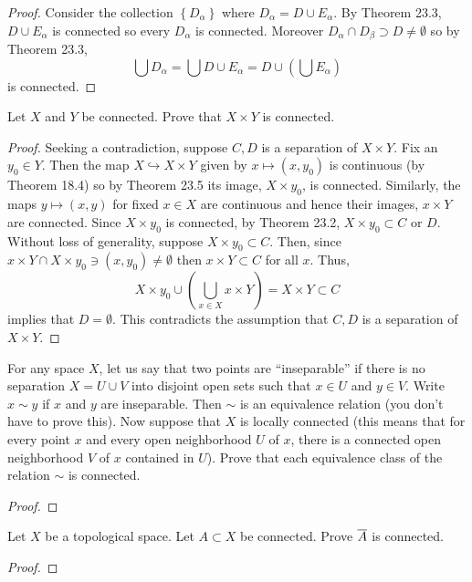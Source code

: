 \begin{proof}
Consider the collection $\left\{D_\alpha\right\}$ where
$D_\alpha=D\cup E_\alpha$. By Theorem 23.3, $D\cup E_\alpha$ is
connected so every $D_\alpha$ is connected. Moreover
$D_\alpha\cap D_\beta\supset D\neq\emptyset$ so by Theorem 23.3,
\[
\bigcup D_\alpha=\bigcup D\cup E_\alpha=D\cup\left(\bigcup E_\alpha\right)
\]
is connected.
\end{proof}
\begin{problem}
Let $X$ and $Y$ be connected. Prove that $X\times Y$ is connected.
\end{problem}
\begin{proof}
Seeking a contradiction, suppose $C,D$ is a separation of
$X\times Y$. Fix an $y_0\in Y$. Then the map
$X\hookrightarrow X\times Y$ given by $x\mapsto (x,y_0)$ is
continuous (by Theorem 18.4) so by Theorem 23.5 its image,
$X\times y_0$, is connected. Similarly, the maps $y\mapsto
(x,y)$ for fixed $x\in X$ are continuous and hence their images,
$x\times Y$ are connected. Since $X\times y_0$ is connected, by
Theorem 23.2, $X\times y_0\subset C$ or $D$. Without loss of
generality, suppose $X\times y_0\subset C$. Then, since $x\times
Y\cap X\times y_0\ni (x,y_0)\neq\emptyset$ then $x\times Y\subset
C$ for all $x$. Thus,
\[
X\times y_0\cup\left(\bigcup_{x\in X}x\times Y\right)=X\times
Y\subset C
\]
implies that $D=\emptyset$. This contradicts the assumption
that $C,D$ is a separation of $X\times Y$.
\end{proof}
\begin{problem}
For any space $X$, let us say that two points are ``inseparable''
if there is no separation $X=U\cup V$ into disjoint open sets
such that $x\in U$ and $y\in V$. Write $x\sim y$ if $x$ and $y$
are inseparable. Then $\sim$ is an equivalence relation (you
don't have to prove this). Now suppose that $X$ is locally
connected (this means that for every point $x$ and every open
neighborhood $U$ of $x$, there is a connected open neighborhood
$V$ of $x$ contained in $U$). Prove that each equivalence class
of the relation $\sim$ is connected.
\end{problem}
\begin{proof}

\end{proof}
\begin{problem}
Let $X$ be a topological space. Let $A\subset X$ be
connected. Prove $\overline{A}$ is connected.
\end{problem}
\begin{proof}
\end{proof}

